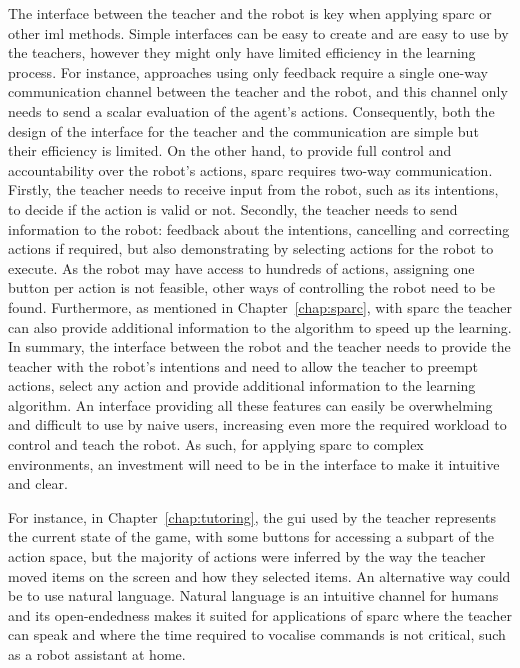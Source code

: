 The interface between the teacher and the robot is key when applying \gls{sparc} or other \gls{iml} methods. Simple interfaces can be easy to create and are easy to use by the teachers, however they might only have limited efficiency in the learning process. For instance, approaches using only feedback require a single one-way communication channel between the teacher and the robot, and this channel only needs to send a scalar evaluation of the agent's actions. Consequently, both the design of the interface for the teacher and the communication are simple but their efficiency is limited. On the other hand, to provide full control and accountability over the robot's actions, \gls{sparc} requires two-way communication. Firstly, the teacher needs to receive input from the robot, such as its intentions, to decide if the action is valid or not. Secondly, the teacher needs to send information to the robot: feedback about the intentions, cancelling and correcting actions if required, but also demonstrating by selecting actions for the robot to execute. As the robot may have access to hundreds of actions, assigning one button per action is not feasible, other ways of controlling the robot need to be found. Furthermore, as mentioned in Chapter~\ref{chap:sparc}, with \gls{sparc} the teacher can also provide additional information to the algorithm to speed up the learning. In summary, the interface between the robot and the teacher needs to provide the teacher with the robot's intentions and need to allow the teacher to preempt actions, select any action and provide additional information to the learning algorithm. An interface providing all these features can easily be overwhelming and difficult to use by naive users, increasing even more the required workload to control and teach the robot. As such, for applying \gls{sparc} to complex environments, an investment will need to be in the interface to make it intuitive and clear. 

For instance, in Chapter~\ref{chap:tutoring}, the \gls{gui} used by the teacher represents the current state of the game, with some buttons for accessing a subpart of the action space, but the majority of actions were inferred by the way the teacher moved items on the screen and how they selected items. An alternative way could be to use natural language. Natural language is an intuitive channel for humans and its open-endedness makes it suited for applications of \gls{sparc} where the teacher can speak and where the time required to vocalise commands is not critical, such as a robot assistant at home.

